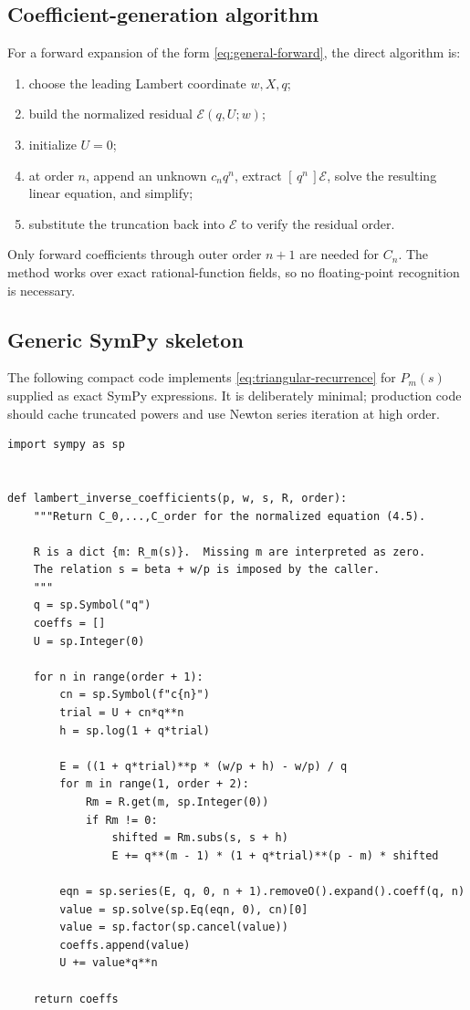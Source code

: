 \documentclass[11pt,a4paper]{article}
\numberwithin{equation}{section}
\theoremstyle{definition}
\theoremstyle{remark}
\newcommand{\coeff}[2]{[\,#1^{#2}\,]}
\begin{document}
\subsection{Coefficient-generation algorithm}

For a forward expansion of the form \cref{eq:general-forward}, the direct
algorithm is:
\begin{enumerate}
\item choose the leading Lambert coordinate \(w,X,q\);
\item build the normalized residual \(\mathscr E(q,U;w)\);
\item initialize \(U=0\);
\item at order \(n\), append an unknown \(c_nq^n\), extract
      \(\coeff qn{\mathscr E}\), solve the resulting linear equation, and
      simplify;
\item substitute the truncation back into \(\mathscr E\) to verify the
      residual order.
\end{enumerate}
Only forward coefficients through outer order \(n+1\) are needed for
\(C_n\).  The method works over exact rational-function fields, so no
floating-point recognition is necessary.

\subsection{Generic SymPy skeleton}

The following compact code implements \cref{eq:triangular-recurrence} for
\(P_m(s)\) supplied as exact SymPy expressions.  It is deliberately
minimal; production code should cache truncated powers and use Newton
series iteration at high order.

\begin{lstlisting}[style=pythonstyle]
import sympy as sp


def lambert_inverse_coefficients(p, w, s, R, order):
    """Return C_0,...,C_order for the normalized equation (4.5).

    R is a dict {m: R_m(s)}.  Missing m are interpreted as zero.
    The relation s = beta + w/p is imposed by the caller.
    """
    q = sp.Symbol("q")
    coeffs = []
    U = sp.Integer(0)

    for n in range(order + 1):
        cn = sp.Symbol(f"c{n}")
        trial = U + cn*q**n
        h = sp.log(1 + q*trial)

        E = ((1 + q*trial)**p * (w/p + h) - w/p) / q
        for m in range(1, order + 2):
            Rm = R.get(m, sp.Integer(0))
            if Rm != 0:
                shifted = Rm.subs(s, s + h)
                E += q**(m - 1) * (1 + q*trial)**(p - m) * shifted

        eqn = sp.series(E, q, 0, n + 1).removeO().expand().coeff(q, n)
        value = sp.solve(sp.Eq(eqn, 0), cn)[0]
        value = sp.factor(sp.cancel(value))
        coeffs.append(value)
        U += value*q**n

    return coeffs
\end{lstlisting}
\end{document}
